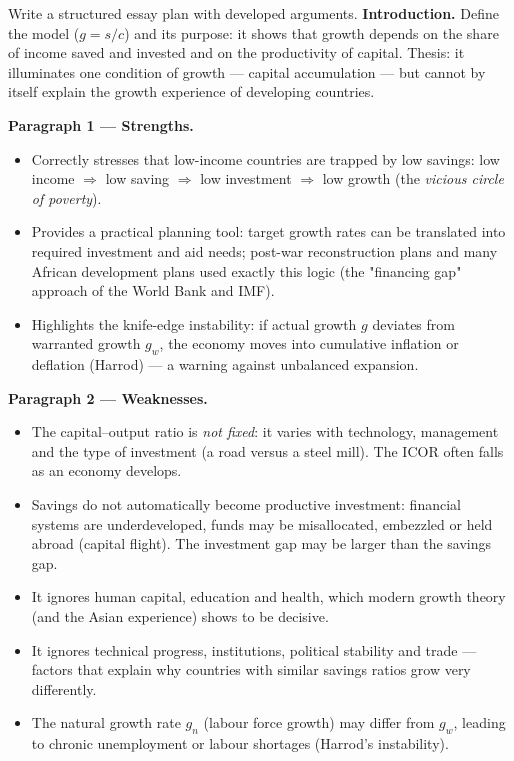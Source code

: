\documentclass[11pt]{article}
\newcommand{\cle}[1]{{\popxbold\color{popdark}#1}}
\begin{document}
\begin{exoresolu}
Write a structured essay plan with developed arguments.
\tcblower
\textbf{Introduction.} Define the model ($g = s/c$) and its purpose: it shows that growth depends on the share of income saved and invested and on the productivity of capital. Thesis: it illuminates one condition of growth — capital accumulation — but cannot by itself explain the growth experience of developing countries.

\textbf{Paragraph 1 — Strengths.}
\begin{itemize}
\item Correctly stresses that low-income countries are trapped by low savings: low income $\Rightarrow$ low saving $\Rightarrow$ low investment $\Rightarrow$ low growth (the \emph{vicious circle of poverty}).
\item Provides a practical planning tool: target growth rates can be translated into required investment and aid needs; post-war reconstruction plans and many African development plans used exactly this logic (the "financing gap" approach of the World Bank and IMF).
\item Highlights the \cle{knife-edge instability}: if actual growth $g$ deviates from warranted growth $g_w$, the economy moves into cumulative inflation or deflation (Harrod) — a warning against unbalanced expansion.
\end{itemize}

\textbf{Paragraph 2 — Weaknesses.}
\begin{itemize}
\item The capital--output ratio is \emph{not fixed}: it varies with technology, management and the type of investment (a road versus a steel mill). The ICOR often falls as an economy develops.
\item Savings do not automatically become productive investment: financial systems are underdeveloped, funds may be misallocated, embezzled or held abroad (capital flight). The \cle{investment gap} may be larger than the savings gap.
\item It ignores \cle{human capital}, education and health, which modern growth theory (and the Asian experience) shows to be decisive.
\item It ignores technical progress, institutions, political stability and trade — factors that explain why countries with similar savings ratios grow very differently.
\item The \cle{natural growth rate} $g_n$ (labour force growth) may differ from $g_w$, leading to chronic unemployment or labour shortages (Harrod's instability).
\end{itemize}


\end{exoresolu}
\end{document}
